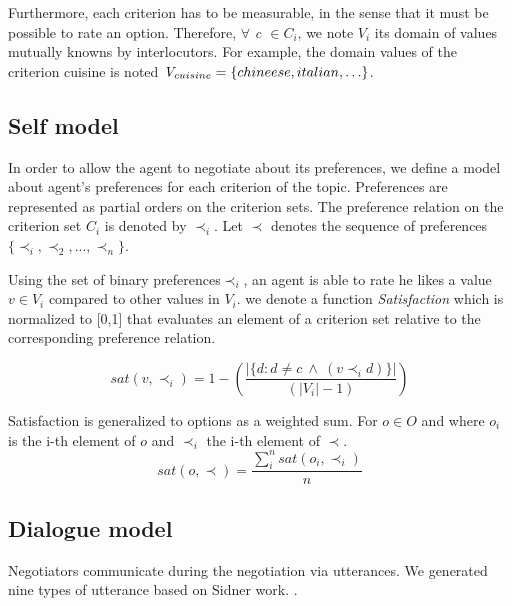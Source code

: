 \documentclass{llncs}
\begin{document}
	Furthermore, each criterion has to be measurable, in the sense that it must be possible to rate an option. Therefore, $\forall$ \emph{c $\in C_i$},  we note \emph{$V_i$} its  domain of values mutually knowns by interlocutors. For example, the domain values of the criterion cuisine is noted $\emph{V}_{cuisine} = \{chineese, italian, \ldots\}$.
%	
%	
%	
	\subsection{Self model} 
		In order to allow the agent to negotiate about its preferences, we define a model about agent's preferences for each criterion of the topic. Preferences are represented as partial orders on the criterion sets. The preference relation on the criterion set $C_i$ is denoted by $\prec_i$.			
		Let $\prec$ denotes the sequence of preferences $\{ \prec_i, \prec_2, ..., \prec_n\}$.
	
		Using the set of binary preferences$\prec_i$, an agent is able to rate he likes a value $v \in V_i$ compared to other values in $V_i$. we denote a function \emph{Satisfaction} which is normalized to [0,1] that evaluates an element of a criterion set relative to the corresponding preference relation.

	\begin{equation}
	sat(v, \prec_i) =	1 - \left( \frac{|\{d : d \neq c \  \wedge \ (v \prec_i d)\}| }{( |V_i| - 1 )}\right)
	\end{equation}
	
	
	Satisfaction is generalized to options as a weighted sum.
	For $o \in O$ and where $o_i$ is the i-th element of $o$ and $\prec_i$ the i-th element of $\prec$.
	\begin{equation}
	sat(o, \prec) = \frac{\sum_{i}^{n} sat(o_i, \prec_i) }{n}
	\end{equation}
	
	\subsection{Dialogue model}
		Negotiators communicate during the negotiation via utterances. We generated nine types of utterance based on Sidner work. \cite{sidnerartificial}. 
		
\end{document}
